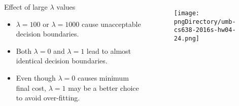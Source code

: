 \documentclass[aspectratio=169]{beamer}
\begin{document}
\begin{slide}

	\begin{columns}

	\begin{block}{Effect of large $\lambda$ values}
	\begin{itemize}
	\item $\lambda = 100$ or $\lambda = 1000$ cause unacceptable decision boundaries.
	\item Both $\lambda = 0$ and $\lambda = 1$ lead to almost identical decision boundaries.
	\item Even though $\lambda = 0$ causes minimum final cost, $\lambda = 1$ may be a better choice to avoid over-fitting.
	\end{itemize}
	\end{block}

	\begin{figure}
	\texttt{[image: \\pngDirectory/umb-cs638-2016s-hw04-24.png]}
	\end{figure}

	\end{columns}

\end{slide}
\end{document}
